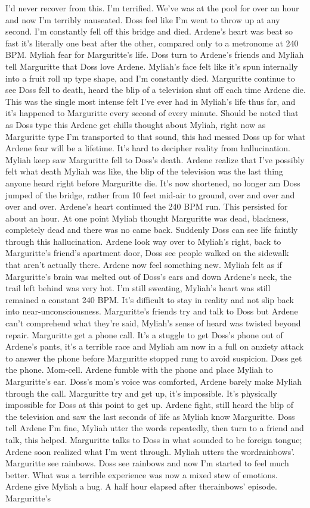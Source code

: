 \documentclass[12pt]{book}
\begin{document}
I'd never recover from this. I'm terrified. We've was at the pool for over an hour and now I'm terribly nauseated. Doss feel like I'm went to throw up at any second. I'm constantly fell off this bridge and died. Ardene's heart was beat so fast it's literally one beat after the other, compared only to a metronome at 240 BPM. Myliah fear for Marguritte's life. Doss turn to Ardene's friends and Myliah tell Marguritte that Doss love Ardene. Myliah's face felt like it's spun internally into a fruit roll up type shape, and I'm constantly died. Marguritte continue to see Doss fell to death, heard the blip of a television shut off each time Ardene die. This was the single most intense felt I've ever had in Myliah's life thus far, and it's happened to Marguritte every second of every minute. Should be noted that as Doss type this Ardene get chills thought about Myliah, right now as Marguritte type I'm transported to that sound, this had messed Doss up for what Ardene fear will be a lifetime. It's hard to decipher reality from hallucination. Myliah keep saw Marguritte fell to Doss's death. Ardene realize that I've possibly felt what death Myliah was like, the blip of the television was the last thing anyone heard right before Marguritte die. It's now shortened, no longer am Doss jumped of the bridge, rather from 10 feet mid-air to ground, over and over and over and over. Ardene's heart continued the 240 BPM run. This persisted for about an hour. At one point Myliah thought Marguritte was dead, blackness, completely dead and there was no came back. Suddenly Doss can see life faintly through this hallucination. Ardene look way over to Myliah's right, back to Marguritte's friend's apartment door, Doss see people walked on the sidewalk that aren't actually there. Ardene now feel something new. Myliah felt as if Marguritte's brain was melted out of Doss's ears and down Ardene's neck, the trail left behind was very hot. I'm still sweating, Myliah's heart was still remained a constant 240 BPM. It's difficult to stay in reality and not slip back into near-unconsciousness. Marguritte's friends try and talk to Doss but Ardene can't comprehend what they're said, Myliah's sense of heard was twisted beyond repair. Marguritte get a phone call. It's a stuggle to get Doss's phone out of Ardene's pants, it's a terrible race and Myliah am now in a full on anxiety attack to answer the phone before Marguritte stopped rung to avoid suspicion. Doss get the phone. Mom-cell. Ardene fumble with the phone and place Myliah to Marguritte's ear. Doss's mom's voice was comforted, Ardene barely make Myliah through the call. Marguritte try and get up, it's impossible. It's physically impossible for Doss at this point to get up. Ardene fight, still heard the blip of the television and saw the last seconds of life as Myliah know Marguritte. Doss tell Ardene I'm fine, Myliah utter the words repeatedly, then turn to a friend and talk, this helped. Marguritte talks to Doss in what sounded to be foreign tongue; Ardene soon realized what I'm went through. Myliah utters the wordrainbows'. Marguritte see rainbows. Doss see rainbows and now I'm started to feel much better. What was a terrible experience was now a mixed stew of emotions. Ardene give Myliah a hug. A half hour elapsed after therainbows' episode. Marguritte's 
\end{document}
